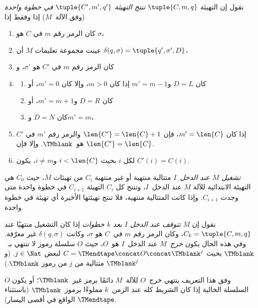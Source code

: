\documentclass[../../../include/open-logic-section]{subfiles}
\begin{document}
\begin{defn}
نقول إن التهيئة $\tuple{C,m,q}$ \emph{تنتج التهيئة
$\tuple{C',m',q'}$ في خطوة واحدة} (وفق الآلة~$M$) إذا وفقط إذا
\begin{enumerate}
\item كان الرمز رقم $m$ في $C$ هو $\sigma$،
\item عينت مجموعة تعليمات $M$ أن $\delta(q,\sigma)=
  \tuple{q',\sigma',D}$،
\item كان الرمز رقم $m$ في $C'$ هو $\sigma'$، و
\item
\begin{enumerate}
\item كان $D=L$ و$m'=m-1$ إذا كان $m>0$، وإلا كان $m'=0$، أو
\item كان $D=R$ و$m'=m+1$، أو
\item كان $D=N$ و$m'=m$،
\end{enumerate}
\item إذا كان $m'=\len{C}$، فإن $\len{C'}=\len{C}+1$ والرمز رقم
  $m'$ في $C'$ هو~$\TMblank$. وإلا فإن $\len{C'}=\len{C}$.
\item لكل $i$ بحيث $i<\len{C}$ و$i\neq m$، يكون $C'(i)=C(i)$.
\end{enumerate}
\end{defn}

\begin{defn}
\emph{تشغيل $M$ عند الدخل~$I$} متتالية منتهية أو غير منتهية $C_i$
من تهيئات $M$، حيث $C_0$ هي التهيئة الابتدائية للآلة $M$ عند
الدخل~$I$، وتنتج كل $C_i$ التهيئة $C_{i+1}$ في خطوة واحدة متى وجدت
$C_{i+1}$. وإذا كانت المتتالية منتهية، فلا تنتج تهيئتها الأخيرة أي
تهيئة في خطوة واحدة.

نقول إن $M$ \emph{تتوقف عند الدخل $I$ بعد $k$ خطوات} إذا كان التشغيل
منتهيًا عند $C_k=\tuple{C,m,q}$، وكان الرمز رقم $m$ في~$C$ هو
$\sigma$، وكانت $\delta(q,\sigma)$ غير معرّفة. وفي هذه الحال يكون
\emph{خرج}~$M$ عند الدخل~$I$ هو~$O$، حيث $O$ سلسلة رموز لا تنتهي
بـ~$\TMblank$ بحيث $C=\TMendtape\concat O\concat\TMblank^j$ لبعض
$j \in \Nat$. (و$\TMblank^j$ متتالية من $j$ من رموز $\TMblank$.)
\end{defn}

\begin{explain}
وفق هذا التعريف ينتهي خرج~$O$ للآلة~$M$ دائمًا برمز غير~$\TMblank$؛
أو يكون $O$ السلسلة الخالية إذا كان الشريط كله عند الزمن~$k$ مملوءًا
برموز~$\TMblank$ (باستثناء $\TMendtape$ الواقع في أقصى اليسار).
\end{explain}
\end{document}
